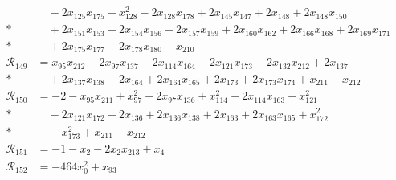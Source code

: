 \begin{align*}
&\quad -2x_{125}x_{175} +x_{128}^{2} -2x_{128}x_{178} +2x_{145}x_{147} +2x_{148} +2x_{148}x_{150} \\*
&\quad +2x_{151}x_{153} +2x_{154}x_{156} +2x_{157}x_{159} +2x_{160}x_{162} +2x_{166}x_{168} +2x_{169}x_{171} \\*
&\quad +2x_{175}x_{177} +2x_{178}x_{180} +x_{210} \\
\mathcal R_{149} &= x_{95}x_{212} -2x_{97}x_{137} -2x_{114}x_{164} -2x_{121}x_{173} -2x_{132}x_{212} +2x_{137} \\*
&\quad +2x_{137}x_{138} +2x_{164} +2x_{164}x_{165} +2x_{173} +2x_{173}x_{174} +x_{211} -x_{212} \\
\mathcal R_{150} &= -2 -x_{95}x_{211} +x_{97}^{2} -2x_{97}x_{136} +x_{114}^{2} -2x_{114}x_{163} +x_{121}^{2} \\*
&\quad -2x_{121}x_{172} +2x_{136} +2x_{136}x_{138} +2x_{163} +2x_{163}x_{165} +x_{172}^{2} \\*
&\quad -x_{173}^{2} +x_{211} +x_{212} \\
\mathcal R_{151} &= -1 -x_{2} -2x_{2}x_{213} +x_{4} \\
\mathcal R_{152} &= -464x_{0}^{2} +x_{93} \\
\end{align*}
\endgroup

